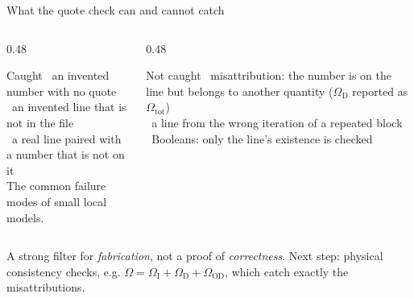 \documentclass[aspectratio=169,10pt,t]{beamer}
\newcommand{\muted}[1]{\textcolor{muted}{#1}}
\begin{document}
\begin{frame}{What the quote check can and cannot catch}
\begin{columns}[T]
\begin{column}{0.48\textwidth}
\begin{propbox}{Caught}
\small
\textbullet\ an invented number with no quote\\
\textbullet\ an invented line that is not in the file\\
\textbullet\ a real line paired with a number that is not on it\\[3pt]
\muted{\footnotesize The common failure modes of small local models.}
\end{propbox}
\end{column}
\begin{column}{0.48\textwidth}
\begin{warnbox}{Not caught}
\small
\textbullet\ misattribution: the number is on the line but belongs to another quantity (\(\Omega_{\mathrm D}\) reported as \(\Omega_{\mathrm{tot}}\))\\
\textbullet\ a line from the wrong iteration of a repeated block\\
\textbullet\ Booleans: only the line's existence is checked
\end{warnbox}
\end{column}
\end{columns}
\vspace{3mm}
\begin{keyline}\small
A strong filter for \emph{fabrication}, not a proof of \emph{correctness}. Next step: physical consistency checks, e.g.
\(\Omega=\Omega_{\mathrm I}+\Omega_{\mathrm D}+\Omega_{\mathrm{OD}}\), which catch exactly the misattributions.
\end{keyline}
\end{frame}
\end{document}
